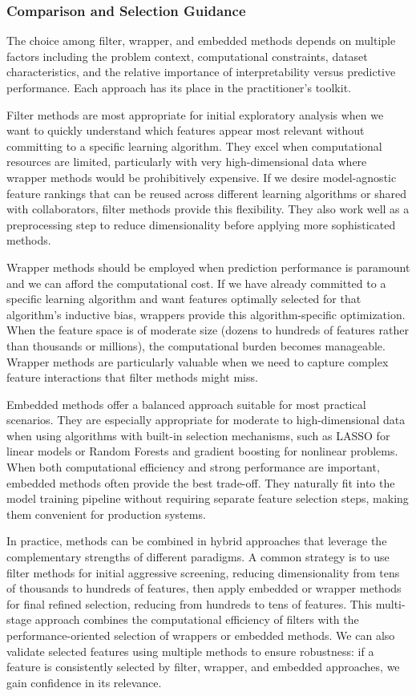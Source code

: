 \subsubsection*{Comparison and Selection Guidance}

The choice among filter, wrapper, and embedded methods depends on multiple factors including the problem context, computational constraints, dataset characteristics, and the relative importance of interpretability versus predictive performance. Each approach has its place in the practitioner's toolkit.

Filter methods are most appropriate for initial exploratory analysis when we want to quickly understand which features appear most relevant without committing to a specific learning algorithm. They excel when computational resources are limited, particularly with very high-dimensional data where wrapper methods would be prohibitively expensive. If we desire model-agnostic feature rankings that can be reused across different learning algorithms or shared with collaborators, filter methods provide this flexibility. They also work well as a preprocessing step to reduce dimensionality before applying more sophisticated methods.

Wrapper methods should be employed when prediction performance is paramount and we can afford the computational cost. If we have already committed to a specific learning algorithm and want features optimally selected for that algorithm's inductive bias, wrappers provide this algorithm-specific optimization. When the feature space is of moderate size (dozens to hundreds of features rather than thousands or millions), the computational burden becomes manageable. Wrapper methods are particularly valuable when we need to capture complex feature interactions that filter methods might miss.

Embedded methods offer a balanced approach suitable for most practical scenarios. They are especially appropriate for moderate to high-dimensional data when using algorithms with built-in selection mechanisms, such as LASSO for linear models or Random Forests and gradient boosting for nonlinear problems. When both computational efficiency and strong performance are important, embedded methods often provide the best trade-off. They naturally fit into the model training pipeline without requiring separate feature selection steps, making them convenient for production systems.

In practice, methods can be combined in hybrid approaches that leverage the complementary strengths of different paradigms. A common strategy is to use filter methods for initial aggressive screening, reducing dimensionality from tens of thousands to hundreds of features, then apply embedded or wrapper methods for final refined selection, reducing from hundreds to tens of features. This multi-stage approach combines the computational efficiency of filters with the performance-oriented selection of wrappers or embedded methods. We can also validate selected features using multiple methods to ensure robustness: if a feature is consistently selected by filter, wrapper, and embedded approaches, we gain confidence in its relevance.

